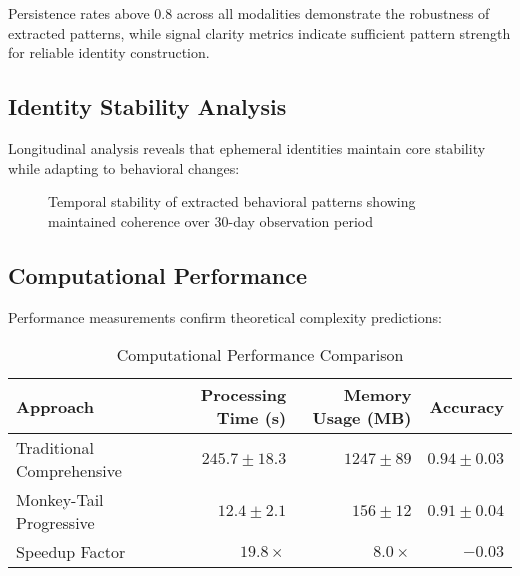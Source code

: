 \documentclass[12pt,a4paper]{article}
\begin{document}
Persistence rates above 0.8 across all modalities demonstrate the robustness of extracted patterns, while signal clarity metrics indicate sufficient pattern strength for reliable identity construction.

\subsection{Identity Stability Analysis}

Longitudinal analysis reveals that ephemeral identities maintain core stability while adapting to behavioral changes:

\begin{figure}[H]
\centering
{}
\caption{Temporal stability of extracted behavioral patterns showing maintained coherence over 30-day observation period}
\end{figure}

\subsection{Computational Performance}

Performance measurements confirm theoretical complexity predictions:

\begin{table}[H]
\centering
\caption{Computational Performance Comparison}
\begin{tabular}{@{}lrrr@{}}
\toprule
Approach & Processing Time (s) & Memory Usage (MB) & Accuracy \\
\midrule
Traditional Comprehensive & $245.7 \pm 18.3$ & $1247 \pm 89$ & $0.94 \pm 0.03$ \\
Monkey-Tail Progressive & $12.4 \pm 2.1$ & $156 \pm 12$ & $0.91 \pm 0.04$ \\
Speedup Factor & $19.8\times$ & $8.0\times$ & $-0.03$ \\
\bottomrule
\end{tabular}
\end{table}
\end{document}
